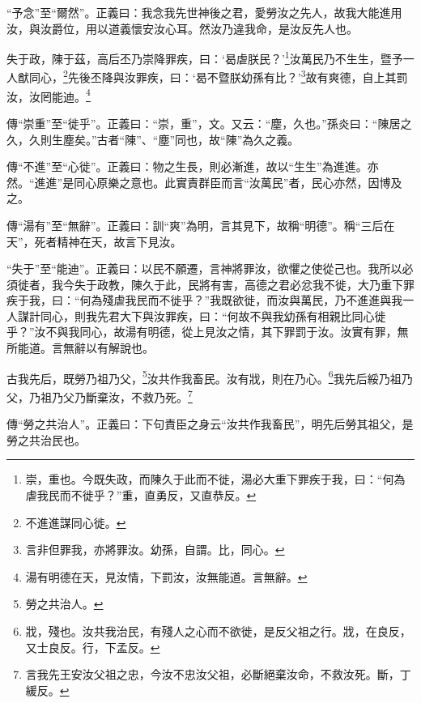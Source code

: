 {\noindent\shu{}\fzkt “予念”至“爾然”。正義曰：我念我先世神後之君，愛勞汝之先人，故我大能進用汝，與汝爵位，用以道義懷安汝心耳。然汝乃違我命，是汝反先人也。 \par}

失于政，陳于茲，高后丕乃崇降罪疾，曰：‘曷虐朕民？’\footnote{崇，重也。今既失政，而陳久于此而不徙，湯必大重下罪疾于我，曰：“何為虐我民而不徙乎？”重，直勇反，又直恭反。}汝萬民乃不生生，暨予一人猷同心，\footnote{不進進謀同心徙。}先後丕降與汝罪疾，曰：‘曷不暨朕幼孫有比？’\footnote{言非但罪我，亦將罪汝。幼孫，自謂。比，同心。}故有爽德，自上其罰汝，汝罔能迪。\footnote{湯有明德在天，見汝情，下罰汝，汝無能道。言無辭。}

{\noindent\zhuan{}\fzbyks 傳“崇重”至“徙乎”。正義曰：“崇，重”，文。又云：“塵，久也。”孫炎曰：“陳居之久，久則生塵矣。”古者“陳”、“塵”同也，故“陳”為久之義。 \par}

{\noindent\zhuan{}\fzbyks 傳“不進”至“心徙”。正義曰：物之生長，則必漸進，故以“生生”為進進。亦然。“進進”是同心原樂之意也。此實責群臣而言“汝萬民”者，民心亦然，因博及之。 \par}

{\noindent\zhuan{}\fzbyks 傳“湯有”至“無辭”。正義曰：訓“爽”為明，言其見下，故稱“明德”。稱“三后在天”，死者精神在天，故言下見汝。 \par}

{\noindent\shu{}\fzkt “失于”至“能迪”。正義曰：以民不願遷，言神將罪汝，欲懼之使從己也。我所以必須徙者，我今失于政教，陳久于此，民將有害，高德之君必忿我不徙，大乃重下罪疾于我，曰：“何為殘虐我民而不徙乎？”我既欲徙，而汝與萬民，乃不進進與我一人謀計同心，則我先君大下與汝罪疾，曰：“何故不與我幼孫有相親比同心徙乎？”汝不與我同心，故湯有明德，從上見汝之情，其下罪罰于汝。汝實有罪，無所能道。言無辭以有解說也。 \par}

古我先后，既勞乃祖乃父，\footnote{勞之共治人。}汝共作我畜民。汝有戕，則在乃心。\footnote{戕，殘也。汝共我治民，有殘人之心而不欲徙，是反父祖之行。戕，在良反，又士良反。行，下孟反。}我先后綏乃祖乃父，乃祖乃父乃斷棄汝，不救乃死。\footnote{言我先王安汝父祖之忠，今汝不忠汝父祖，必斷絕棄汝命，不救汝死。斷，丁緩反。}

{\noindent\zhuan{}\fzbyks 傳“勞之共治人”。正義曰：下句責臣之身云“汝共作我畜民”，明先后勞其祖父，是勞之共治民也。 \par}

